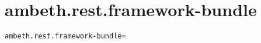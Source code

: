 \section{ambeth.rest.framework-bundle}
\label{configuration:AmbethRestFrameworkBundle}
\ClearAPI
\TODO%
\begin{lstlisting}[style=Props,caption={Usage example for \textit{ambeth.rest.framework-bundle}}]
ambeth.rest.framework-bundle=
\end{lstlisting}